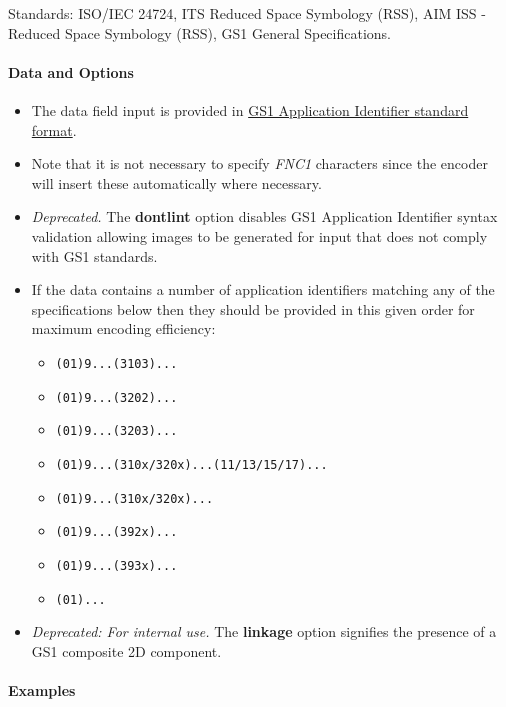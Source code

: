 Standards: ISO/IEC 24724, ITS Reduced Space Symbology (RSS), AIM ISS -
Reduced Space Symbology (RSS), GS1 General Specifications.

\hypertarget{data-and-options-36}{%
\paragraph{Data and Options}\label{data-and-options-36}}

\begin{itemize}
\tightlist
\item
  The data field input is provided in
  \protect\hyperlink{gs1-application-identifier-standard-format}{GS1
  Application Identifier standard format}.
\item
  Note that it is not necessary to specify \emph{FNC1} characters since
  the encoder will insert these automatically where necessary.
\item
  \emph{Deprecated.} The \textbf{dontlint} option disables GS1
  Application Identifier syntax validation allowing images to be
  generated for input that does not comply with GS1 standards.
\item
  If the data contains a number of application identifiers matching any
  of the specifications below then they should be provided in this given
  order for maximum encoding efficiency:

  \begin{itemize}
  \tightlist
  \item
    \texttt{(01)9...(3103)...}
  \item
    \texttt{(01)9...(3202)...}
  \item
    \texttt{(01)9...(3203)...}
  \item
    \texttt{(01)9...(310x/320x)...(11/13/15/17)...}
  \item
    \texttt{(01)9...(310x/320x)...}
  \item
    \texttt{(01)9...(392x)...}
  \item
    \texttt{(01)9...(393x)...}
  \item
    \texttt{(01)...}
  \end{itemize}
\item
  \emph{Deprecated: For internal use.} The \textbf{linkage} option
  signifies the presence of a GS1 composite 2D component.
\end{itemize}

\hypertarget{examples-26}{%
\paragraph{Examples}\label{examples-26}}

